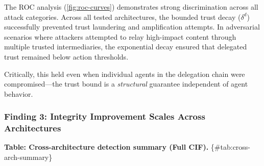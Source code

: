 \documentclass[
]{article}
\begin{document}
The ROC analysis (\cref{fig:roc-curves}) demonstrates strong
discrimination across all attack categories. Across all tested
architectures, the bounded trust decay (\(\delta^d\)) successfully
prevented trust laundering and amplification attempts. In adversarial
scenarios where attackers attempted to relay high-impact content through
multiple trusted intermediaries, the exponential decay ensured that
delegated trust remained below action thresholds.

Critically, this held even when individual agents in the delegation
chain were compromised---the trust bound is a \textit{structural}
guarantee independent of agent behavior.

\subsubsection{Finding 3: Integrity Improvement Scales Across
Architectures}\label{finding-3-integrity-improvement-scales-across-architectures}

\textbf{Table: Cross-architecture detection summary (Full CIF).}
\{\#tab:cross-arch-summary\}
\end{document}
